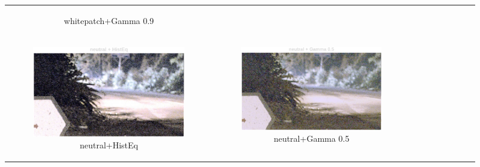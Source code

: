 \documentclass[11pt, a4]{article}
\begin{document}
\begin{enumerate}
\begin{enumerate}
\begin{figure}[h]
{\begin{tabular}{cccc}
\begin{subfigure}[h]{0.45\linewidth}
							\caption{whitepatch+Gamma 0.9}
							\label{fig:RawImage3_tone_8}
						\end{subfigure}\\
						\begin{subfigure}[h]{0.45\linewidth}
							\centering
							\includegraphics[width=\linewidth]{../output/RawImage3_Tone_neutral_HistEq.pdf}
							\caption{neutral+HistEq}
							\label{fig:RawImage3_tone_9}
						\end{subfigure} &
						\begin{subfigure}[h]{0.45\linewidth}
							\centering
							\includegraphics[width=\linewidth]{../output/RawImage3_Tone_neutral_Gamma0.5.pdf}
							\caption{neutral+Gamma 0.5}
							\label{fig:RawImage3_tone_10}
						\end{subfigure} &
						\begin{subfigure}[h]{0.45\linewidth}
							\centering

\end{subfigure}
\end{tabular}}
\end{figure}
\end{enumerate}
\end{enumerate}
\end{document}
